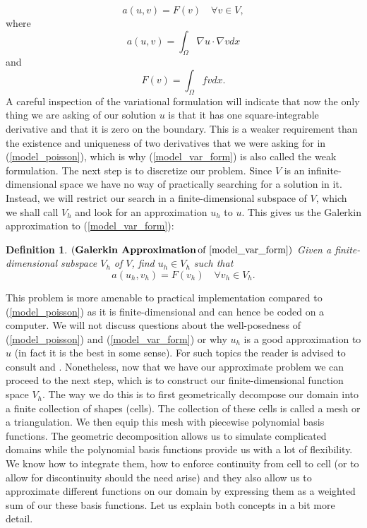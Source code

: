 \documentclass[12pt,a4paper]{article}
\newtheorem{definition}[theorem]{Definition}
\theoremstyle{definition}
\begin{document}
\begin{equation}\label{model_var_form}
a\left(u,v\right)=F\left(v\right) \quad \forall v \in V,
\end{equation}
where 
\begin{equation}
a\left(u,v\right) = \int_{\Omega}\nabla u \cdot \nabla v dx 
\end{equation} 
and
\begin{equation}
F\left(v\right) = \int_{\Omega}fvdx.
\end{equation}
A careful inspection of the variational formulation will indicate that now the only thing we are asking of our solution $u$ is that it has one square-integrable derivative and that it is zero on the boundary.  This is a weaker requirement than the existence and uniqueness of two derivatives that we were asking for in (\ref{model_poisson}), which is why (\ref{model_var_form}) is also called the weak formulation.  The next step is to discretize our problem.  Since $V$ is an infinite-dimensional space we have no way of practically searching for a solution in it.   Instead, we will restrict our search in a finite-dimensional subspace of $V$, which we shall call $V_h$ and look for an approximation $u_h$ to $u$.  This gives us the Galerkin approximation to (\ref{model_var_form}):

\theoremstyle{definition}
\begin{definition}{$\left(\textbf{Galerkin Approximation}\,\text{of \ref{model_var_form}}\right)$} 
	Given a finite-dimensional subspace $V_h$ of $V$, find  $u_h \in V_h$ such that
	\begin{equation}
a\left(u_h,v_h\right)=F\left(v_h\right) \quad \forall v_h \in V_h.
	\end{equation}
\end{definition}
This problem is more amenable to practical implementation compared to (\ref{model_poisson}) as it is finite-dimensional and can hence be coded on a computer.  We will not discuss questions about the well-posedness of (\ref{model_poisson}) and (\ref{model_var_form}) or why $u_h$ is a good approximation to $u$ (in fact it is the best in some sense).  For such topics the reader is advised to consult \cite{brenner2007mathematical} and \cite{ern2013theory}. Nonetheless, now that we have our approximate problem we can proceed to the next step, which is  to construct our finite-dimensional function space $V_h$.  
The way we do this is to first geometrically decompose our domain into a finite collection of shapes (cells).  The collection of these cells is called a mesh or a triangulation.  We then equip this mesh with piecewise polynomial basis functions.  The geometric decomposition allows us to simulate complicated domains while the polynomial basis functions provide us with a lot of flexibility.  We know how to integrate them, how to enforce continuity from cell to cell (or to allow for discontinuity should the need arise) and they also allow us to approximate different functions on our domain  by expressing them as a weighted sum of our these basis functions.  Let us explain both concepts in a bit more detail.
\end{document}
